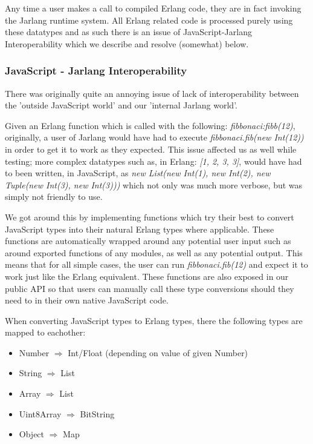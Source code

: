 \documentclass[twoside,12pt,titlepage,a4paper]{article}
\begin{document}
Any time a user makes a call to compiled Erlang code, they are in fact invoking the Jarlang runtime system. All Erlang related code is processed purely using these datatypes and as such there is an issue of JavaScript-Jarlang Interoperability which we describe and resolve (somewhat) below.

\subsubsection{JavaScript - Jarlang Interoperability}
There was originally quite an annoying issue of lack of interoperability between the 'outside JavaScript world' and our 'internal Jarlang world'. 

Given an Erlang function which is called with the following: \textit{fibbonaci:fibb(12)}, originally, a user of Jarlang would have had to execute \textit{fibbonaci.fib(new Int(12))} in order to get it to work as they expected. This issue affected us as well while testing; more complex datatypes such as, in Erlang: \textit{[1, 2, {3, 3}]}, would have had to been written, in JavaScript, as \textit{new List(new Int(1), new Int(2), new Tuple(new Int(3), new Int(3)))} which not only was much more verbose, but was simply not friendly to use.

We got around this by implementing functions which try their best to convert JavaScript types into their natural Erlang types where applicable. These functions are automatically wrapped around any potential user input such as around exported functions of any modules, as well as any potential output. This means that for all simple cases, the user can run \textit{fibbonaci.fib(12)} and expect it to work just like the Erlang equivalent. These functions are also exposed in our public API so that users can manually call these type conversions should they need to in their own native JavaScript code.

When converting JavaScript types to Erlang types, there the following types are mapped to eachother:

\begin{itemize}
	\item Number $\Rightarrow$ Int/Float (depending on value of given Number)
	\item String $\Rightarrow$ List
	\item Array $\Rightarrow$ List
	\item Uint8Array $\Rightarrow$ BitString
	\item Object $\Rightarrow$ Map
\end{itemize}
\end{document}
